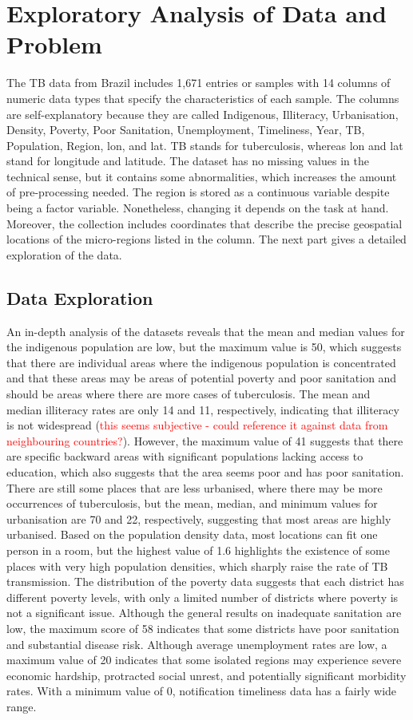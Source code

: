 \section{Exploratory Analysis of Data and Problem}

The TB data from Brazil includes 1,671 entries or samples with 14 columns of numeric data types that specify the characteristics of each sample. The columns are self-explanatory because they are called Indigenous, Illiteracy, Urbanisation, Density, Poverty, Poor Sanitation, Unemployment, Timeliness, Year, TB, Population, Region, lon, and lat. TB stands for tuberculosis, whereas lon and lat stand for longitude and latitude. The dataset has no missing values in the technical sense, but it contains some abnormalities, which increases the amount of pre-processing needed. The region is stored as a continuous variable despite being a factor variable. Nonetheless, changing it depends on the task at hand. Moreover, the collection includes coordinates that describe the precise geospatial locations of the micro-regions listed in the column. The next part gives a detailed exploration of  the data.

\subsection{Data Exploration}

An in-depth analysis of the datasets reveals that the mean and median values for the indigenous population are low, but the maximum value is 50, which suggests that there are individual areas where the indigenous population is concentrated and that these areas may be areas of potential poverty and poor sanitation and should be areas where there are more cases of tuberculosis. The mean and median illiteracy rates are only 14 and 11, respectively, indicating that illiteracy is not widespread (\textcolor{red}{this seems subjective - could reference it against data from neighbouring countries?}). However, the maximum value of 41 suggests that there are specific backward areas with significant populations lacking access to education, which also suggests that the area seems poor and has poor sanitation. There are still some places that are less urbanised, where there may be more occurrences of tuberculosis, but the mean, median, and minimum values for urbanisation are 70 and 22, respectively, suggesting that most areas are highly urbanised. Based on the population density data, most locations can fit one person in a room, but the highest value of 1.6 highlights the existence of some places with very high population densities, which sharply raise the rate of TB transmission. The distribution of the poverty data suggests that each district has different poverty levels, with only a limited number of districts where poverty is not a significant issue. Although the general results on inadequate sanitation are low, the maximum score of 58 indicates that some districts have poor sanitation and substantial disease risk. Although average unemployment rates are low, a maximum value of 20 indicates that some isolated regions may experience severe economic hardship, protracted social unrest, and potentially significant morbidity rates. With a minimum value of 0, notification timeliness data has a fairly wide range.

